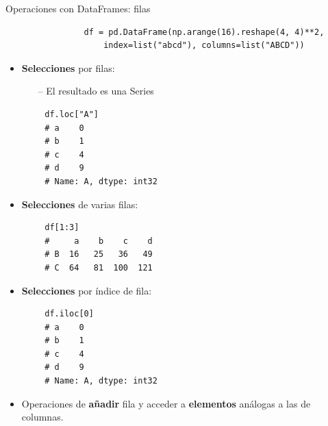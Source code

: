 \documentclass[10pt]{beamer} %
\begin{document}
\begin{frame}[fragile]{Operaciones con DataFrames: filas}
    \begin{verbatim}
                df = pd.DataFrame(np.arange(16).reshape(4, 4)**2,
                    index=list("abcd"), columns=list("ABCD"))
    \end{verbatim}
    \begin{multicols}{2}
        \begin{itemize}
            \item \textbf{Selecciones} por filas:
            \begin{itemize}
                \item[--] El resultado es una Series
            \end{itemize}
        \end{itemize}
        \begin{verbatim}
        df.loc["A"]
        # a    0
        # b    1
        # c    4
        # d    9
        # Name: A, dtype: int32
        \end{verbatim}
        
        \begin{itemize}
            \item \textbf{Selecciones} de varias filas:
        \end{itemize}
        \begin{verbatim}
        df[1:3]
        #     a    b    c    d
        # B  16   25   36   49
        # C  64   81  100  121
        \end{verbatim}
    \columnbreak
        \begin{itemize}
            \item \textbf{Selecciones} por índice de fila:
        \end{itemize}
        \begin{verbatim}
        df.iloc[0]
        # a    0
        # b    1
        # c    4
        # d    9
        # Name: A, dtype: int32
        \end{verbatim}
        
        \begin{itemize}
            \item Operaciones de \textbf{añadir} fila y acceder a \textbf{elementos} análogas a las de columnas.
        \end{itemize}
    \end{multicols}
\end{frame}
\end{document}
